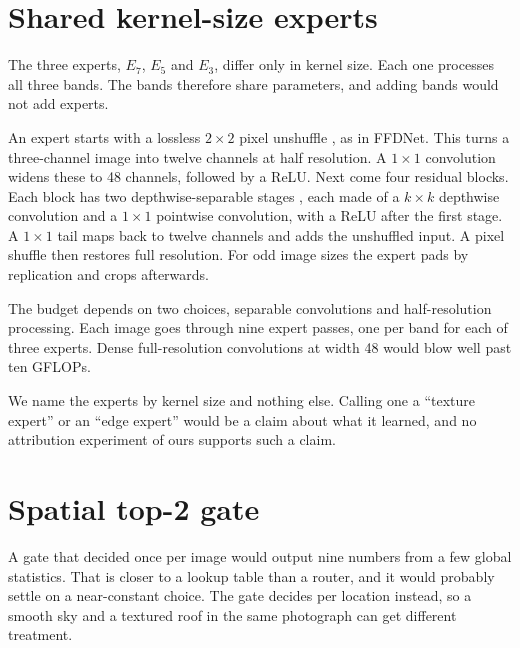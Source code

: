\section{Shared kernel-size experts}\label{sec:experts}

The three experts, $E_7$, $E_5$ and $E_3$, differ only in kernel size. Each
one processes all three bands. The bands therefore share parameters, and
adding bands would not add experts.

An expert starts with a lossless $2\times2$ pixel unshuffle
\cite{shi2016espcn}, as in FFDNet. This turns a three-channel image into
twelve channels at half resolution. A $1\times1$ convolution widens these to
48 channels, followed by a ReLU. Next come four residual blocks. Each block
has two depthwise-separable stages \cite{chollet2017xception}, each made of a
$k\times k$ depthwise convolution and a $1\times1$ pointwise convolution, with
a ReLU after the first stage. A $1\times1$ tail maps back to twelve channels
and adds the unshuffled input. A pixel shuffle then restores full resolution.
For odd image sizes the expert pads by replication and crops afterwards.

The budget depends on two choices, separable convolutions and
half-resolution processing. Each image goes through nine expert passes, one
per band for each of three experts. Dense full-resolution convolutions at
width 48 would blow well past ten GFLOPs.

We name the experts by kernel size and nothing else. Calling one a ``texture
expert'' or an ``edge expert'' would be a claim about what it learned, and no
attribution experiment of ours supports such a claim.

\section{Spatial top-2 gate}\label{sec:gate}

A gate that decided once per image would output nine numbers from a few
global statistics. That is closer to a lookup table than a router, and it
would probably settle on a near-constant choice. The \fcsg{} gate decides per
location instead, so a smooth sky and a textured roof in the same photograph
can get different treatment.

